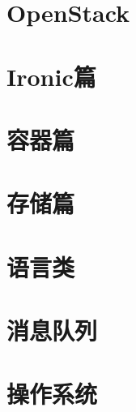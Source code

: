\documentclass[b5paper]{book}
\newenvironment{sourcecode}{\captionsetup{type=listing}}{}
\newenvironment{code-block}[1]
 {\VerbatimEnvironment
  \begin{mdframed}[topline=false, bottomline=false, leftline=false,
                   rightline=false, backgroundcolor=lbcolor,
                   userdefinedwidth=\textwidth]
  \begin{verbatim}}
 {\end{verbatim}\end{mdframed}}
\begin{document}
\newpage

\frontmatter
{
  \renewcommand*\contentsname{目录}
  \tableofcontents%
  \thispagestyle{empty}
}

\mainmatter

%

\part{OpenStack}

\part{Ironic篇}





\part{容器篇}




\part{存储篇}


\part{语言类}





\part{消息队列}

\part{操作系统}



\end{document}
